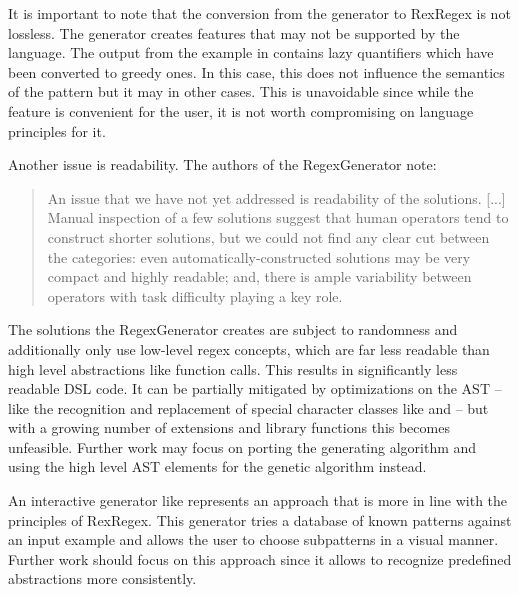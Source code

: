 It is important to note that the conversion from the generator to RexRegex is not lossless. The generator creates features that may not be supported by the language. The output from the example in  contains lazy quantifiers which have been converted to greedy ones. In this case, this does not influence the semantics of the pattern but it may in other cases. This is unavoidable since while the feature is convenient for the user, it is not worth compromising on language principles for it.

Another issue is readability. The authors of the RegexGenerator note: 

{\small
\begin{quote}
An issue that we have not yet addressed is readability of the solutions. [...] Manual inspection of a few solutions suggest that human operators tend to construct shorter solutions, but we could not find any clear cut between the categories: even automatically-constructed solutions may be very compact and highly readable; and, there is ample variability between operators with task difficulty playing a key role. \cite{bartoli2016can}
\end{quote}
}

The solutions the RegexGenerator creates are subject to randomness and additionally only use low-level regex concepts, which are far less readable than high level abstractions like function calls. This results in significantly less readable DSL code. It can be partially mitigated by optimizations on the AST -- like the recognition and replacement of special character classes like  and  -- but with a growing number of extensions and library functions this becomes unfeasible. Further work may focus on porting the generating algorithm and using the high level AST elements for the genetic algorithm instead.

An interactive generator like \cite{noxoneRegexGenerator} represents an approach that is more in line with the principles of RexRegex. This generator tries a database of known patterns against an input example and allows the user to choose subpatterns in a visual manner. Further work should focus on this approach since it allows to recognize predefined abstractions more consistently.



